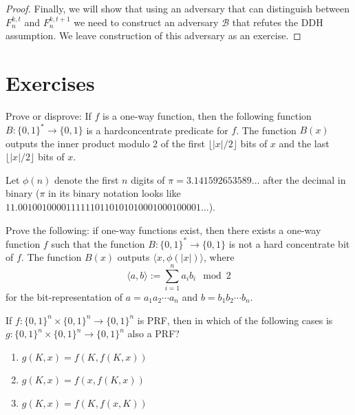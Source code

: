\begin{proof}
    Finally, we will show that using an adversary that can distinguish between $F_n^{k,t}$ and $F_n^{k,t+1}$ we need to construct an adversary $\mathcal{B}$ that refutes the DDH assumption. We leave construction of this adversary as an exercise.
\end{proof}


\newpage
\section*{Exercises}
\begin{exercise}
    \newcommand{\bit}{\{0,1\}}

    Prove or disprove: If $f$ is a one-way function, then the following function $B:\bit^*\to\bit$ is a hardconcentrate predicate for $f$. The function $B(x)$ outputs the inner product modulo 2 of the first $\lfloor |x|/2\rfloor$ bits of $x$ and the last $\lfloor |x|/2\rfloor$ bits of $x$.
\end{exercise}

\begin{exercise}
    Let $\phi(n)$ denote the first $n$ digits of $\pi = 3.141592653589\ldots$ after the decimal in binary ($\pi$ in its binary notation looks like $11.00100100001111110110101010001000100001\ldots$).

    Prove the following: if one-way functions exist, then there exists a one-way function $f$ such that the function $B:\{0,1\}^* \rightarrow \{0,1\}$ is not a hard concentrate bit of $f$. The function $B(x)$ outputs $\langle x, \phi(|x|)\rangle$, where
    \[\langle a, b\rangle := \sum_{i=1}^n a_i b_i \mod 2\]
    for the bit-representation of $a = {a_1a_2\cdots a_n}$ and $b= {b_1b_2\cdots b_n}$.
\end{exercise}

\begin{exercise}
    If $f: \{0,1\}^{n}\times \{0,1\}^n\rightarrow \{0,1\}^n$  is PRF, then in which of the following cases is $g: \{0,1\}^{n}\times \{0,1\}^n\rightarrow \{0,1\}^n$ also a PRF? \begin{enumerate} \item $g(K,x) = f(K,f(K,x))$ \item $g(K,x) = f(x,f(K,x))$ \item $g(K,x) = f(K,f(x,K))$
    \end{enumerate}
\end{exercise}

